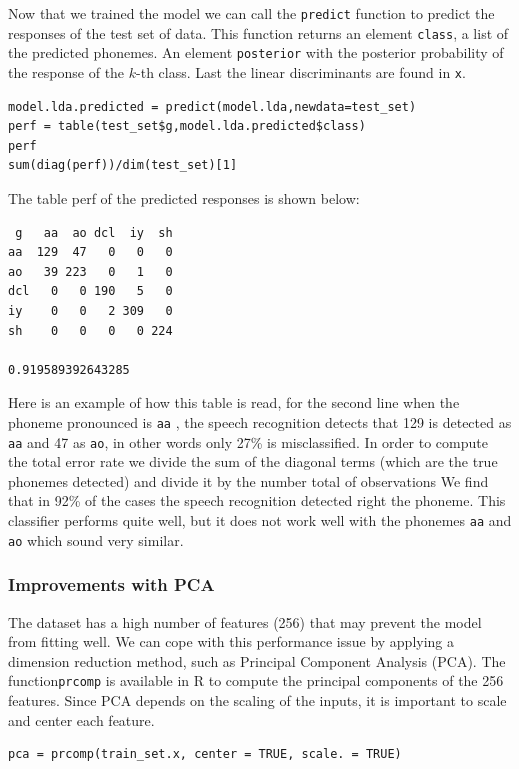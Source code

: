 \documentclass[]{report}
\begin{document}
Now that we trained the model we can call the \texttt{predict} function to predict the responses of the test set of data. This function returns an element \texttt{class}, a list of the predicted phonemes. An element \texttt{posterior} with the posterior probability of the response of the $k$-th class.  Last the linear discriminants are found in \texttt{x}.

\begin{lstlisting}
model.lda.predicted = predict(model.lda,newdata=test_set)
perf = table(test_set$g,model.lda.predicted$class)
perf
sum(diag(perf))/dim(test_set)[1]
\end{lstlisting}

The table perf of the predicted responses is shown below:
\begin{center}
\begin{verbatim}
 g 	 aa  ao dcl  iy  sh
aa  129  47   0   0   0
ao   39 223   0   1   0
dcl   0   0 190   5   0
iy    0   0   2 309   0
sh    0   0   0   0 224

0.919589392643285
\end{verbatim}
\end{center}

Here is an example of how this table is read, for the second line
when the phoneme pronounced is \texttt{aa} , the speech recognition detects that 129 is detected as \texttt{aa} and 47 as \texttt{ao}, in other words only 27\% is misclassified.
In order to compute the total error rate we divide the sum of the diagonal terms (which are the true phonemes detected) and divide it by the number total of observations We find that in 92\% of the cases the speech recognition detected right the phoneme. This classifier performs quite well, but it does not work well with the phonemes \texttt{aa} and \texttt{ao} which sound very similar.

\subsubsection{Improvements with PCA}
The dataset has a high number of features (256) that may prevent the model from fitting well. We can cope with this performance issue by applying a dimension reduction method, such as Principal Component Analysis (PCA). The function\texttt{prcomp} is available in R to compute the principal components of the 256 features. Since PCA depends on the scaling of the inputs, it is important to scale and center each feature.
\begin{lstlisting}
pca = prcomp(train_set.x, center = TRUE, scale. = TRUE)
\end{lstlisting}
\end{document}
